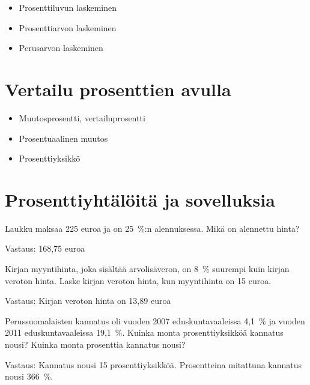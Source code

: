 \begin{itemize}
	\item Prosenttiluvun laskeminen
	\item Prosenttiarvon laskeminen
	\item Perusarvon laskeminen
\end{itemize}

\section{Vertailu prosenttien avulla}

\begin{itemize}
	\item Muutosprosentti, vertailuprosentti
	\item Prosentuaalinen muutos
	\item Prosenttiyksikkö
\end{itemize}

\section{Prosenttiyhtälöitä ja sovelluksia}

\begin{tehtava}
    Laukku maksaa 225 euroa ja on 25~\%:n alennuksessa. Mikä on alennettu hinta?
    
    \begin{vastaus}
    Vastaus: 168,75 euroa
    \end{vastaus}
\end{tehtava}

\begin{tehtava}
    Kirjan myyntihinta, joka sisältää arvolisäveron, on 8~\% suurempi kuin kirjan
    veroton hinta. Laske kirjan veroton hinta, kun myyntihinta on 15 euroa.
    
    \begin{vastaus}
        Vastaus: Kirjan veroton hinta on 13,89 euroa
    \end{vastaus}
\end{tehtava}

\begin{tehtava}
    Perussuomalaisten kannatus oli vuoden 2007 eduskuntavaaleissa 4,1~\% ja
    vuoden 2011 eduskuntavaaleissa 19,1~\%. Kuinka monta prosenttiyksikköä kannatus nousi? Kuinka monta prosenttia kannatus nousi?
    \begin{vastaus}
    Vastaus: Kannatus nousi 15 prosenttiyksikköä. Prosentteina mitattuna
    kannatus nousi 366~\%.
    \end{vastaus}
\end{tehtava}

